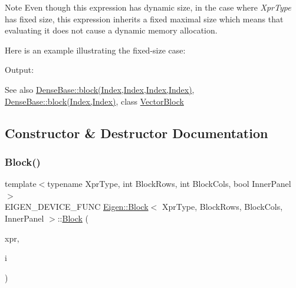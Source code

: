 \begin{DoxyNote}{Note}
Even though this expression has dynamic size, in the case where {\itshape Xpr\+Type} has fixed size, this expression inherits a fixed maximal size which means that evaluating it does not cause a dynamic memory allocation.
\end{DoxyNote}
Here is an example illustrating the fixed-\/size case\+: 
\begin{DoxyCodeInclude}{0}
\end{DoxyCodeInclude}
 Output\+: 
\begin{DoxyVerbInclude}
\end{DoxyVerbInclude}


\begin{DoxySeeAlso}{See also}
\mbox{\hyperlink{class_eigen_1_1_dense_base_ab8e42e67c5cfd5fa13e684642f0f65bf}{Dense\+Base\+::block(\+Index,\+Index,\+Index,\+Index)}}, \mbox{\hyperlink{class_eigen_1_1_dense_base_adfadb0b888358ae1f521cc0a106ddb85}{Dense\+Base\+::block(\+Index,\+Index)}}, class \mbox{\hyperlink{class_eigen_1_1_vector_block}{Vector\+Block}} 
\end{DoxySeeAlso}


\subsection{Constructor \& Destructor Documentation}
\mbox{\label{class_eigen_1_1_block_ab45272f7223731c9a61937e55795c728}} 
\subsubsection{\texorpdfstring{Block()}{Block()}\hspace{0.1cm}{\footnotesize\ttfamily [1/3]}}
{\footnotesize\ttfamily template$<$typename Xpr\+Type, int Block\+Rows, int Block\+Cols, bool Inner\+Panel$>$ \\
E\+I\+G\+E\+N\+\_\+\+D\+E\+V\+I\+C\+E\+\_\+\+F\+U\+NC \mbox{\hyperlink{class_eigen_1_1_block}{Eigen\+::\+Block}}$<$ Xpr\+Type, Block\+Rows, Block\+Cols, Inner\+Panel $>$\+::\mbox{\hyperlink{class_eigen_1_1_block}{Block}} (\begin{DoxyParamCaption}\item[{Xpr\+Type \&}]{xpr,  }\item[{Index}]{i }\end{DoxyParamCaption})\hspace{0.3cm}{\ttfamily [inline]}}

